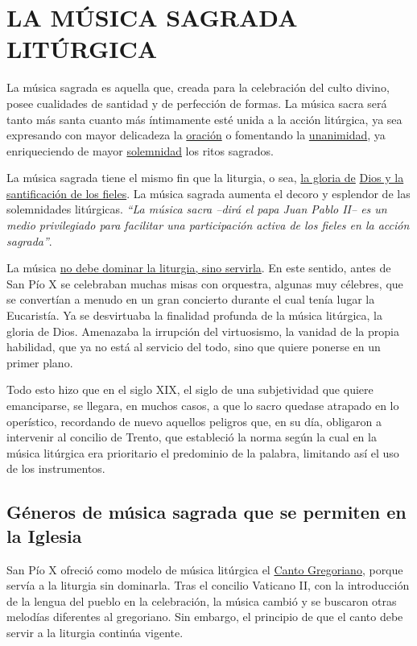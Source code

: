 \documentclass[letterpaper, 12pt]{book}
\begin{document}
    \chapter{LA M\'USICA SAGRADA LIT\'URGICA}
    La m\'usica sagrada es aquella que, creada para la celebraci\'on del culto divino, posee cualidades de santidad y de perfecci\'on de formas. La m\'usica sacra ser\'a tanto m\'as santa cuanto m\'as \'intimamente est\'e unida a la acci\'on lit\'urgica, ya sea expresando con mayor delicadeza la \underline{oraci\'on} o fomentando la \underline{unanimidad}, ya enriqueciendo de mayor \underline{solemnidad} los ritos sagrados.\newline
    
    La m\'usica sagrada tiene el mismo fin que la liturgia, o sea, \underline{la gloria de} \underline{Dios y la santificaci\'on de los fieles}. La música sagrada aumenta el decoro y esplendor de las solemnidades litúrgicas. \textit{``La m\'usica sacra --dir\'a el papa Juan Pablo II-- es un medio privilegiado para facilitar una participaci\'on activa de los fieles en la acción sagrada''}.\newline
    
    La m\'usica \underline{no debe dominar la liturgia, sino servirla}. En este sentido, antes de San P\'io X se celebraban muchas misas con orquestra, algunas muy c\'elebres, que se convert\'ian a menudo en un gran concierto durante el cual ten\'ia lugar la Eucarist\'ia. Ya se desvirtuaba la finalidad profunda de la m\'usica lit\'urgica, la gloria de Dios. Amenazaba la irrupci\'on del virtuosismo, la vanidad de la propia habilidad, que ya no est\'a al servicio del todo, sino que quiere ponerse en un primer plano.\newline
    
    Todo esto hizo que en el siglo XIX, el siglo de una subjetividad que quiere emanciparse, se llegara, en muchos casos, a que lo sacro quedase atrapado en lo oper\'istico, recordando de nuevo aquellos peligros que, en su d\'ia, obligaron a intervenir al concilio de Trento, que estableci\'o la norma seg\'un la cual en la m\'usica lit\'urgica era prioritario el predominio de la palabra, limitando as\'i el uso de los instrumentos.
    
    \section{G\'eneros de m\'usica sagrada que se permiten en la Iglesia}
    San P\'io X ofreci\'o como modelo de m\'usica lit\'urgica el \underline{Canto Gregoriano}, porque serv\'ia a la liturgia sin dominarla. Tras el concilio Vaticano II, con la introducci\'on de la lengua del pueblo en la celebraci\'on, la m\'usica cambi\'o y se buscaron otras melod\'ias diferentes al gregoriano. Sin embargo, el principio de que el canto debe servir a la liturgia continúa vigente.\newline
    
\end{document}
